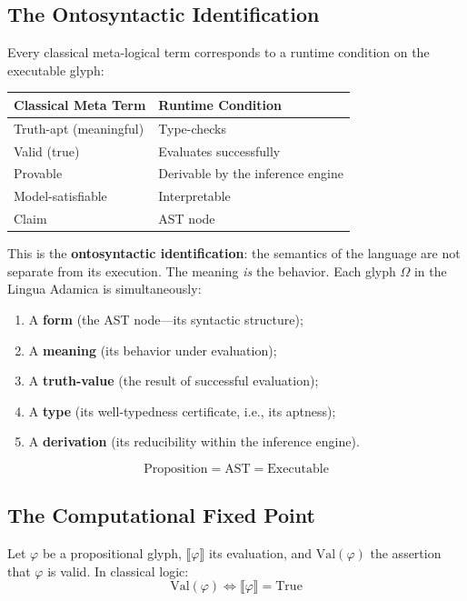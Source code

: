 \documentclass[12pt, letterpaper]{book}
\def\equiv{=}%
\begin{document}
\subsection{The Ontosyntactic Identification}

Every classical meta-logical term corresponds to a runtime condition on the executable glyph:

\begin{center}
\begin{tabular}{ll}
\toprule
\textbf{Classical Meta Term} & \textbf{Runtime Condition} \\
\midrule
Truth-apt (meaningful) & Type-checks \\
Valid (true) & Evaluates successfully \\
Provable & Derivable by the inference engine \\
Model-satisfiable & Interpretable \\
Claim & AST node \\
\bottomrule
\end{tabular}
\end{center}

This is the \textbf{ontosyntactic identification}: the semantics of the language are not separate from its execution. The meaning \textit{is} the behavior. Each glyph $\Omega$ in the Lingua Adamica is simultaneously:

\begin{enumerate}[label=(\roman*)]
    \item A \textbf{form} (the AST node---its syntactic structure);
    \item A \textbf{meaning} (its behavior under evaluation);
    \item A \textbf{truth-value} (the result of successful evaluation);
    \item A \textbf{type} (its well-typedness certificate, i.e., its aptness);
    \item A \textbf{derivation} (its reducibility within the inference engine).
\end{enumerate}

\[
\mathrm{Proposition} \equiv \mathrm{AST} \equiv \mathrm{Executable}
\]

\subsection{The Computational Fixed Point}

Let $\varphi$ be a propositional glyph, $\llbracket \varphi \rrbracket$ its evaluation, and $\mathrm{Val}(\varphi)$ the assertion that $\varphi$ is valid. In classical logic:
\[
\mathrm{Val}(\varphi) \iff \llbracket \varphi \rrbracket = \mathrm{True} \tag{Object level}
\]
\end{document}
